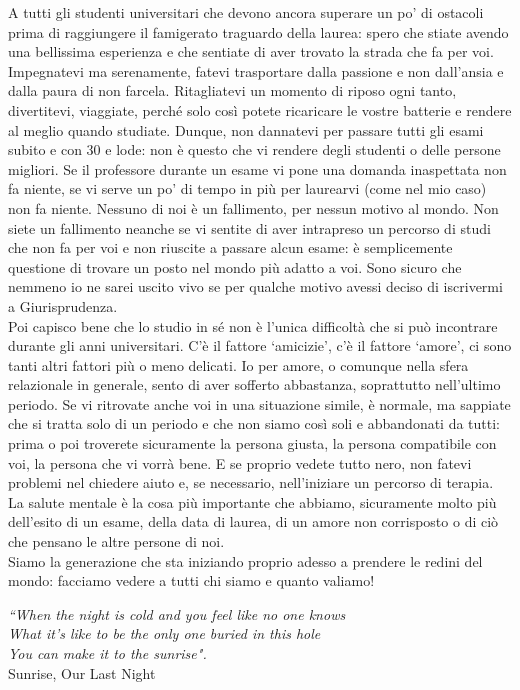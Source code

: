 \documentclass[10pt, oneside]{book}
\begin{document}
\noindent A tutti gli studenti universitari che devono ancora superare un po' di ostacoli prima di raggiungere il famigerato traguardo della laurea: spero che stiate avendo una bellissima esperienza e che sentiate di aver trovato la strada che fa per voi. Impegnatevi ma serenamente, fatevi trasportare dalla passione e non dall'ansia e dalla paura di non farcela. Ritagliatevi un momento di riposo ogni tanto, divertitevi, viaggiate, perché solo così potete ricaricare le vostre batterie e rendere al meglio quando studiate. Dunque, non dannatevi per passare tutti gli esami subito e con 30 e lode: non è questo che vi rendere degli studenti o delle persone migliori. Se il professore durante un esame vi pone una domanda inaspettata non fa niente, se vi serve un po' di tempo in più per laurearvi (come nel mio caso) non fa niente. Nessuno di noi è un fallimento, per nessun motivo al mondo. Non siete un fallimento neanche se vi sentite di aver intrapreso un percorso di studi che non fa per voi e non riuscite a passare alcun esame: è semplicemente questione di trovare un posto nel mondo più adatto a voi. Sono sicuro che nemmeno io ne sarei uscito vivo se per qualche motivo avessi deciso di iscrivermi a Giurisprudenza.\\
Poi capisco bene che lo studio in sé non è l'unica difficoltà che si può incontrare durante gli anni universitari. C'è il fattore `amicizie', c'è il fattore `amore', ci sono tanti altri fattori più o meno delicati. Io per amore, o comunque nella sfera relazionale in generale, sento di aver sofferto abbastanza, soprattutto nell'ultimo periodo. Se vi ritrovate anche voi in una situazione simile, è normale, ma sappiate che si tratta solo di un periodo e che non siamo così soli e abbandonati da tutti: prima o poi troverete sicuramente la persona giusta, la persona compatibile con voi, la persona che vi vorrà bene. E se proprio vedete tutto nero, non fatevi problemi nel chiedere aiuto e, se necessario, nell'iniziare un percorso di terapia. La salute mentale è la cosa più importante che abbiamo, sicuramente molto più dell'esito di un esame, della data di laurea, di un amore non corrisposto o di ciò che pensano le altre persone di noi.\\
Siamo la generazione che sta iniziando proprio adesso a prendere le redini del mondo: facciamo vedere a tutti chi siamo e quanto valiamo!
\vspace{5em} %

\begin{center}
\textit{``When the night is cold and you feel like no one knows}\\
\textit{What it's like to be the only one buried in this hole}\\
\textit{You can make it to the sunrise".}\\
\vspace{2em} %
\hspace{15em} \footnotesize Sunrise, Our Last Night
\end{center}
\end{document}
